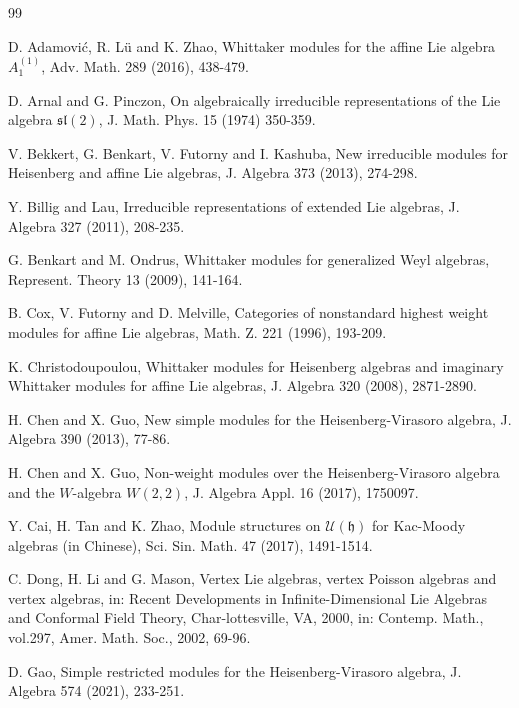 \documentclass[12pt, reqno]{amsart}
\numberwithin{equation}{section}
\numberwithin{equation}{section}
\def\h{\mathfrak{h}}
\def\U{\mathcal{U}}
\begin{document}
\begin{thebibliography}{99}

D. Adamovi{\'c},
R. L{\"u} and K. Zhao, Whittaker modules for the affine Lie algebra $A^{(1)}_1$,
Adv. Math. 289 (2016), 438-479.



D. Arnal and G. Pinczon,
On algebraically irreducible representations of the Lie algebra $\mathfrak{sl}(2)$,
J. Math. Phys. 15 (1974) 350-359.



V. Bekkert, G. Benkart, V. Futorny and I. Kashuba,
New irreducible modules for Heisenberg and affine Lie algebras,
J. Algebra 373 (2013), 274-298.



Y. Billig and Lau,
Irreducible representations of extended Lie algebras,
J. Algebra 327 (2011), 208-235.



G. Benkart and M. Ondrus,
Whittaker modules for generalized Weyl algebras,
Represent. Theory 13 (2009), 141-164.



B. Cox, V. Futorny and D. Melville,
Categories of nonstandard highest weight modules for affine Lie algebras,
Math. Z. 221 (1996), 193-209.


K. Christodoupoulou,
Whittaker modules for Heisenberg algebras and imaginary Whittaker modules for affine Lie algebras,
J. Algebra 320 (2008), 2871-2890.


H. Chen and X. Guo,
New simple modules for the Heisenberg-Virasoro algebra,
J. Algebra 390 (2013), 77-86.


H. Chen and X. Guo,
Non-weight modules over the Heisenberg-Virasoro algebra and the $W$-algebra $W(2,2)$,
J. Algebra Appl. 16 (2017), 1750097.



Y. Cai, H. Tan and K. Zhao,
Module structures on $\U(\h)$ for Kac-Moody algebras (in Chinese),
Sci. Sin. Math. 47 (2017), 1491-1514.

C. Dong, H. Li and G. Mason,
Vertex Lie algebras, vertex Poisson algebras and vertex algebras,
in: Recent Developments in Infinite-Dimensional Lie Algebras and Conformal Field Theory, Char-lottesville, VA, 2000, in: Contemp. Math., vol.297, Amer. Math. Soc., 2002, 69-96.



D. Gao,
Simple restricted modules for the Heisenberg-Virasoro algebra,
J. Algebra 574 (2021), 233-251.



\end{thebibliography}
\end{document}
